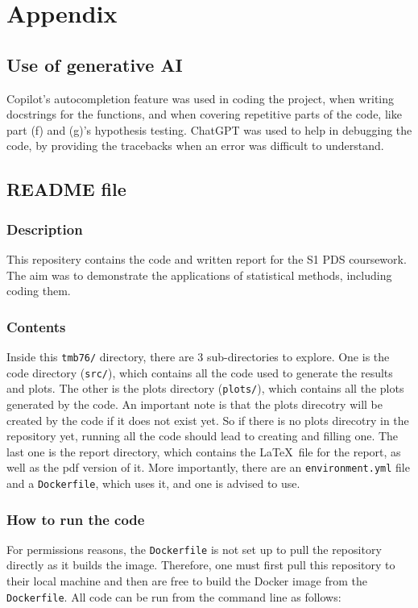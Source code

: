 \documentclass[12pt]{report} %
\begin{document}
\section*{Appendix}

\subsection*{Use of generative AI}
Copilot's autocompletion feature was used in coding the project, when writing docstrings for the functions, and when covering repetitive parts of the code, like part (f) and (g)'s hypothesis testing.
ChatGPT was used to help in debugging the code, by providing the tracebacks when an error was difficult to understand.

\subsection*{README file}

\subsubsection*{Description} 
This repositery contains the code and written report for the S1 PDS coursework. The aim was to demonstrate the applications of statistical methods, including coding them.

\subsubsection*{Contents}  
Inside this \texttt{tmb76/} directory, there are 3 sub-directories to explore. One is the code directory (\texttt{src/}), which contains all the code used to generate the results and plots. The other is the plots directory (\texttt{plots/}), which contains all the plots generated by the code. An important note is that the plots direcotry will be created by the code if it does not exist yet. So if there is no plots direcotry in the repository yet, running all the code should lead to creating and filling one. The last one is the report directory, which contains the \LaTeX\ file for the report, as well as the pdf version of it. More importantly, there are an \texttt{environment.yml} file and a \texttt{Dockerfile}, which uses it, and one is advised to use.

\subsubsection*{How to run the code}
For permissions reasons, the \texttt{Dockerfile} is not set up to pull the repository directly as it builds the image. Therefore, one must first pull this repository to their local machine and then are free to build the Docker image from the \texttt{Dockerfile}.
All code can be run from the command line as follows:
\end{document}
